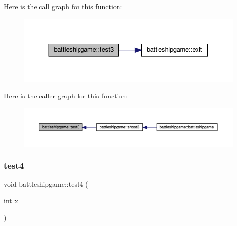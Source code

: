 Here is the call graph for this function\+:
\nopagebreak
\begin{figure}[H]
\begin{center}
\leavevmode
\includegraphics[width=330pt]{classbattleshipgame_a58028520908b9161db6158aa3478f00c_cgraph}
\end{center}
\end{figure}
Here is the caller graph for this function\+:
\nopagebreak
\begin{figure}[H]
\begin{center}
\leavevmode
\includegraphics[width=350pt]{classbattleshipgame_a58028520908b9161db6158aa3478f00c_icgraph}
\end{center}
\end{figure}
\mbox{\label{classbattleshipgame_a9176cadc06e920eb0aba9679f49e96ca}} 
\subsubsection{\texorpdfstring{test4}{test4}}
{\footnotesize\ttfamily void battleshipgame\+::test4 (\begin{DoxyParamCaption}\item[{int}]{x }\end{DoxyParamCaption})\hspace{0.3cm}{\ttfamily [slot]}}

